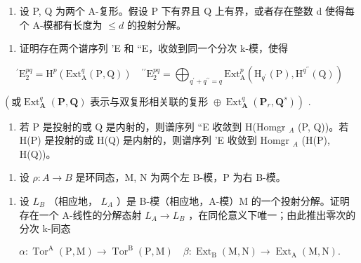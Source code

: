 \begin{enumerate}
\def\labelenumi{\arabic{enumi})}
\setcounter{enumi}{7}
\tightlist
\item
  设 P, Q 为两个 A-复形。假设 P 下有界且 Q 上有界，或者存在整数 d 使得每个 A-模都有长度为 \(\leqslant d\) 的投射分解。
\end{enumerate}

\begin{enumerate}
\def\labelenumi{\alph{enumi})}
\tightlist
\item
  证明存在两个谱序列 'E 和 ``E，收敛到同一个分次 k-模，使得
\end{enumerate}

\[
^ {\prime} \mathrm{E} _ {2} ^ {p q} = \mathrm{H} ^ {p} (\mathrm{Ext} _ {\mathrm{A}} ^ {q} (\mathrm{P}, \mathrm{Q})) \quad^ {\prime \prime} \mathrm{E} _ {2} ^ {p q} = \bigoplus_ {q ^ {\prime} + q ^ {\prime \prime} = q} \mathrm{Ext} _ {\mathrm{A}} ^ {p} (\mathrm{H} _ {q ^ {\prime}} (\mathrm{P}), \mathrm{H} ^ {q ^ {\prime \prime}} (\mathrm{Q}))
\]

\((\text{或} \operatorname{Ext}_{\mathbf{A}}^{q}(\mathbf{P}, \mathbf{Q}) \text{ 表示与双复形相关联的复形 } \oplus \operatorname{Ext}_{\mathbf{A}}^{q}(\mathbf{P}_{r}, \mathbf{Q}^{s}))\) .

\begin{enumerate}
\def\labelenumi{\alph{enumi})}
\setcounter{enumi}{1}
\tightlist
\item
  若 P 是投射的或 Q 是内射的，则谱序列 ``E 收敛到 H(Homgr \(_A\) (P, Q))。若 H(P) 是投射的或 H(Q) 是内射的，则谱序列 'E 收敛到 Homgr \(_A\) (H(P), H(Q))。
\end{enumerate}


\begin{enumerate}
\def\labelenumi{\arabic{enumi})}
\tightlist
\item
  设 \(\rho: A \to B\) 是环同态，M, N 为两个左 B-模，P 为右 B-模。
\end{enumerate}

\begin{enumerate}
\def\labelenumi{\alph{enumi})}
\tightlist
\item
  设 \(L_{B}\) （相应地， \(L_{A}\) ）是 B-模（相应地，A-模）M 的一个投射分解。证明存在一个 A-线性的分解态射 \(L_{A} \rightarrow L_{B}\) ，在同伦意义下唯一；由此推出零次的分次 k-同态
\end{enumerate}

\[
\alpha : \operatorname{Tor} ^ {\mathrm{A}} (\mathrm{P}, \mathrm{M}) \rightarrow \operatorname{Tor} ^ {\mathrm{B}} (\mathrm{P}, \mathrm{M}) \quad \beta : \operatorname{Ext} _ {\mathrm{B}} (\mathrm{M}, \mathrm{N}) \rightarrow \operatorname{Ext} _ {\mathrm{A}} (\mathrm{M}, \mathrm{N}).
\]

